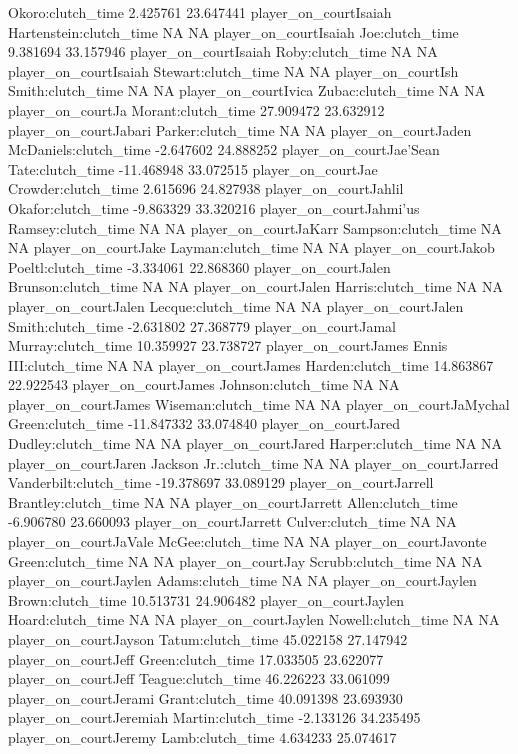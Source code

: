 \documentclass[
  landscape]{article}
\begin{document}
Okoro:clutch\_time 2.425761 23.647441 player\_on\_courtIsaiah
Hartenstein:clutch\_time NA NA player\_on\_courtIsaiah Joe:clutch\_time
9.381694 33.157946 player\_on\_courtIsaiah Roby:clutch\_time NA NA
player\_on\_courtIsaiah Stewart:clutch\_time NA NA player\_on\_courtIsh
Smith:clutch\_time NA NA player\_on\_courtIvica Zubac:clutch\_time NA NA
player\_on\_courtJa Morant:clutch\_time 27.909472 23.632912
player\_on\_courtJabari Parker:clutch\_time NA NA player\_on\_courtJaden
McDaniels:clutch\_time -2.647602 24.888252 player\_on\_courtJae'Sean
Tate:clutch\_time -11.468948 33.072515 player\_on\_courtJae
Crowder:clutch\_time 2.615696 24.827938 player\_on\_courtJahlil
Okafor:clutch\_time -9.863329 33.320216 player\_on\_courtJahmi'us
Ramsey:clutch\_time NA NA player\_on\_courtJaKarr Sampson:clutch\_time
NA NA player\_on\_courtJake Layman:clutch\_time NA NA
player\_on\_courtJakob Poeltl:clutch\_time -3.334061 22.868360
player\_on\_courtJalen Brunson:clutch\_time NA NA player\_on\_courtJalen
Harris:clutch\_time NA NA player\_on\_courtJalen Lecque:clutch\_time NA
NA player\_on\_courtJalen Smith:clutch\_time -2.631802 27.368779
player\_on\_courtJamal Murray:clutch\_time 10.359927 23.738727
player\_on\_courtJames Ennis III:clutch\_time NA NA
player\_on\_courtJames Harden:clutch\_time 14.863867 22.922543
player\_on\_courtJames Johnson:clutch\_time NA NA player\_on\_courtJames
Wiseman:clutch\_time NA NA player\_on\_courtJaMychal Green:clutch\_time
-11.847332 33.074840 player\_on\_courtJared Dudley:clutch\_time NA NA
player\_on\_courtJared Harper:clutch\_time NA NA player\_on\_courtJaren
Jackson Jr.:clutch\_time NA NA player\_on\_courtJarred
Vanderbilt:clutch\_time -19.378697 33.089129 player\_on\_courtJarrell
Brantley:clutch\_time NA NA player\_on\_courtJarrett Allen:clutch\_time
-6.906780 23.660093 player\_on\_courtJarrett Culver:clutch\_time NA NA
player\_on\_courtJaVale McGee:clutch\_time NA NA
player\_on\_courtJavonte Green:clutch\_time NA NA player\_on\_courtJay
Scrubb:clutch\_time NA NA player\_on\_courtJaylen Adams:clutch\_time NA
NA player\_on\_courtJaylen Brown:clutch\_time 10.513731 24.906482
player\_on\_courtJaylen Hoard:clutch\_time NA NA player\_on\_courtJaylen
Nowell:clutch\_time NA NA player\_on\_courtJayson Tatum:clutch\_time
45.022158 27.147942 player\_on\_courtJeff Green:clutch\_time 17.033505
23.622077 player\_on\_courtJeff Teague:clutch\_time 46.226223 33.061099
player\_on\_courtJerami Grant:clutch\_time 40.091398 23.693930
player\_on\_courtJeremiah Martin:clutch\_time -2.133126 34.235495
player\_on\_courtJeremy Lamb:clutch\_time 4.634233 25.074617
\end{document}
